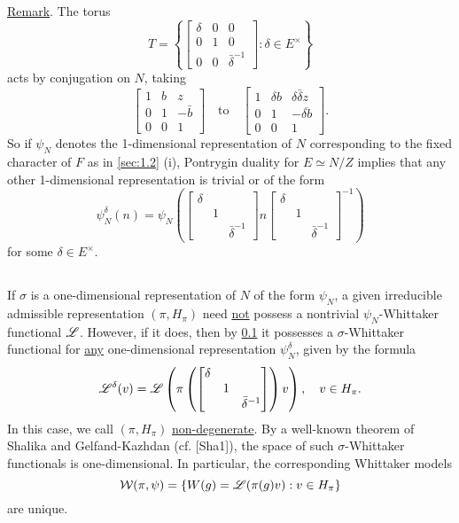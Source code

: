 \subsection{}
\label{sec:1.4}


\underline{Remark}. The torus
\[
    T = \left\{\begin{bmatrix} \delta & 0 & 0 \\ 0 & 1& 0 \\ 0 & 0 & \bar{\delta}^{-1}\end{bmatrix}: \delta \in E^\times\right\}
\]
acts by conjugation on $N$, taking
\[
    \begin{bmatrix}
        1 & b& z \\ 0 & 1& -\bar{b} \\ 0 & 0 & 1
    \end{bmatrix} \quad \text{to} \quad
    \begin{bmatrix}
        1 & \delta b & \delta \bar{\delta} z \\ 0 & 1 & -\overline{\delta b} \\ 0 & 0 & 1
    \end{bmatrix}.
\]
So if $\psi_N$ denotes the 1-dimensional representation of $N$ corresponding to the fixed character of $F$ as in \ref{sec:1.2} (i), Pontrygin duality for $E \simeq N/Z$ implies that any other 1-dimensional representation is trivial or of the form
\[
    \psi_N^\delta (n) = \psi_N \left(\begin{bmatrix}
        \delta & & \\ & 1 & \\ & & \bar{\delta}^{-1}
    \end{bmatrix} n \begin{bmatrix}
        \delta & & \\ & 1 & \\ & & \bar{\delta}^{-1}
    \end{bmatrix}^{-1}\right)
\]
for some $\delta \in E^\times$.


\subsection{}
\label{sec:1.5}

If $\sigma$ is a one-dimensional representation of $N$ of the form $\psi_N$, a given irreducible admissible representation $(\pi, H_\pi)$ need \underline{not} possess a nontrivial $\psi_N$-Whittaker functional $\mathscr{L}$.
However, if it does, then by \ref{sec:1.4} it possesses a $\sigma$-Whittaker functional for \underline{any} one-dimensional representation $\psi_N^\delta$, given by the formula
\[
    \mathscr{L}^\delta(v) = \mathscr{L}\left(\pi\left(\begin{bmatrix}
        \delta & & \\ & 1 & \\ & & \bar{\delta}^{-1}
    \end{bmatrix}\right)v\right), \quad v \in H_\pi.
\]
In this case, we call $(\pi, H_\pi)$ \underline{non-degenerate}.
By a well-known theorem of Shalika and Gelfand-Kazhdan (cf. [Sha1]), the space of such $\sigma$-Whittaker functionals is one-dimensional.
In particular, the corresponding Whittaker models
\[
    \mathcal{W}(\pi, \psi) = \{ W(g) = \mathscr{L}(\pi(g) v): v \in H_\pi \}
\]
are unique.


